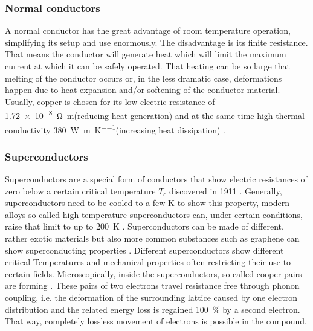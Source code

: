             \subsubsection{Normal conductors}
                A normal conductor has the great advantage of room temperature operation, simplifying its setup and use enormously. The disadvantage is  its finite resistance. That means the conductor will generate heat which will limit the maximum current at which it can be safely operated.  That heating can be so large that melting of the conductor occurs or, in the less dramatic case, deformations happen due to heat expansion and/or softening of the conductor material. Usually, copper is chosen for its low electric resistance of \SI{1.72e-8}{\ohm\meter}(reducing heat generation) and at the same time high thermal conductivity \SI{380}{\watt\per\m\per\kelvin}(increasing heat dissipation) \cite{schofield_f._h._thermal_1925}.
            \subsubsection{Superconductors}
            \label{sec:theory:superconductor}
            Superconductors are a special form of conductors that show electric resistances of zero below a certain critical temperature $T_c$ discovered in 1911 \cite{onnes_resistance_nodate}. Generally, superconductors need to be cooled to a few \si{\kelvin} to show this property, modern alloys so called high temperature superconductors can, under certain conditions, raise that limit to up to \SI{200}{\kelvin} \cite{drozdov_conventional_2015}. Superconductors can be made of different, rather exotic materials but also more common substances such as graphene can show superconducting properties \cite{cao_unconventional_2018}. Different superconductors show different critical Temperatures and mechanical properties often restricting their use to certain fields. Microscopically, inside the superconductors, so called cooper pairs are forming \cite{bardeen_theory_1957}. These pairs of two electrons travel resistance free through phonon coupling, i.e. the deformation of the surrounding lattice caused by one electron distribution and the related energy loss is regained \SI{100}{\percent} by a second electron. That way, completely lossless movement of electrons is possible in the compound.
